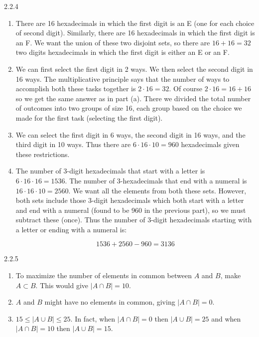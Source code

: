 \documentclass[11pt,]{book}
\theoremstyle{ptxplainnotitle}
\theoremstyle{ptxplaintitle}
\theoremstyle{ptxdefinitionnotitle}
\theoremstyle{ptxdefinitiontitle}
\theoremstyle{ptxdefinitionnotitle}
\theoremstyle{ptxdefinitiontitle}
\theoremstyle{ptxdefinitionnotitle}
\theoremstyle{ptxdefinitiontitle}
\theoremstyle{ptxdefinitiontitlenonumber}
\theoremstyle{ptxdefinitiontitlenonumber}
\numberwithin{equation}{chapter}
\newcommand{\card}[1]{\left| #1 \right|}
\begin{document}
\begin{divisionexercise}{2.2.4}
\textbf{}\hypertarget{p-1105}{}%
\leavevmode%
\begin{enumerate}[label=(\alph*)]
\item\hypertarget{li-478}{}\hypertarget{p-1106}{}%
There are 16 hexadecimals in which the first digit is an E (one for each choice of second digit). Similarly, there are 16 hexadecimals in which the first digit is an F. We want the union of these two disjoint sets, so there are \(16 + 16 = 32\) two digits hexadecimals in which the first digit is either an E or an F.%
\item\hypertarget{li-479}{}\hypertarget{p-1107}{}%
We can first select the first digit in 2 ways. We then select the second digit in 16 ways. The multiplicative principle says that the number of ways to accomplish both these tasks together is \(2 \cdot 16 = 32\text{.}\) Of course \(2 \cdot 16 = 16 + 16\) so we get the same answer as in part (a). There we divided the total number of outcomes into two groups of size 16, each group based on the choice we made for the first task (selecting the first digit).%
\item\hypertarget{li-480}{}\hypertarget{p-1108}{}%
We can select the first digit in 6 ways, the second digit in 16 ways, and the third digit in 10 ways. Thus there are \(6\cdot 16 \cdot 10 = 960\) hexadecimals given these restrictions.%
\item\hypertarget{li-481}{}\hypertarget{p-1109}{}%
The number of 3-digit hexadecimals that start with a letter is \(6 \cdot 16 \cdot 16 = 1536\text{.}\) The number of 3-hexadecimals that end with a numeral is \(16 \cdot 16 \cdot 10 = 2560\text{.}\) We want all the elements from both these sets. However, both sets include those 3-digit hexadecimals which both start with a letter and end with a numeral (found to be 960 in the previous part), so we must subtract these (once). Thus the number of 3-digit hexadecimals starting with a letter or ending with a numeral is:%
\par
\hypertarget{p-1110}{}%
%
\begin{equation*}
1536 + 2560 - 960 = 3136
\end{equation*}
%
\end{enumerate}
%
\end{divisionexercise}%
\begin{divisionexercise}{2.2.5}
\textbf{}\hypertarget{p-1124}{}%
\leavevmode%
\begin{enumerate}[label=(\alph*)]
\item\hypertarget{li-491}{}\hypertarget{p-1125}{}%
To maximize the number of elements in common between \(A\) and \(B\text{,}\) make \(A \subset B\text{.}\)  This would give \(\card{A \cap B} = 10\text{.}\)%
\item\hypertarget{li-492}{}\hypertarget{p-1126}{}%
\(A\) and \(B\) might have no elements in common, giving \(\card{A\cap B} = 0\text{.}\)%
\item\hypertarget{li-493}{}\hypertarget{p-1127}{}%
\(15 \le \card{A \cup B} \le 25\text{.}\)  In fact, when \(\card{A \cap B} = 0\) then \(\card{A \cup B} = 25\) and when \(\card{A \cap B} = 10\) then \(\card{A \cup B} = 15\text{.}\)%
\end{enumerate}
%
\end{divisionexercise}%
\end{document}
